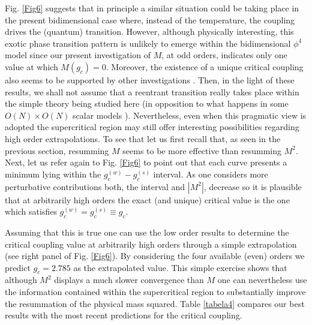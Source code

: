 \documentclass[a4paper,11pt]{article}
\begin{document}
Fig. \ref{Fig6} suggests that in principle a similar situation  could be taking place in the present bidimensional case where, instead of the temperature, the coupling drives the (quantum) transition.   However, although physically interesting, this exotic phase transition pattern is unlikely to emerge within the bidimensional $\phi^4$ model since our present investigation of $M$, at odd orders, indicates only one value at which $M(g_c)=0$. Moreover, the existence of a unique critical coupling  also seems to be supported by other investigations \cite {hamilton6, hamilton7, serone1, serone3}.  Then, in the light of these results, we shall  not assume that a  reentrant transition  really takes place within the simple theory being studied here (in opposition to what happens in some $O(N)\times O(N)$ scalar models \cite{julia}). 
Nevertheless, even when this pragmatic view is adopted the supercritical region may still offer  interesting possibilities regarding high order extrapolations.  To see that let us first recall that, as seen in the previous section, resumming $M$ seems to be more effective than resumming $M^2$.  Next, let us refer again to Fig. \ref {Fig6} to point out that each curve presents a minimum lying within the $g_c^{(w)}-g_c^{(s)}$ interval. As one considers more perturbative contributions  both, the interval and $|M^2|$, decrease so it is plausible that at arbitrarily high orders the exact (and unique) critical value is the one  which satisfies  $g_c^{(w)} = g_c^{(s)} \equiv g_c$. 

Assuming that this is true one can use the low order results to determine the critical coupling value at arbitrarily high orders  through a simple extrapolation (see right panel of Fig. \ref{Fig6}). By  considering the four available (even) orders we  predict $g_c = 2.785$ as the extrapolated value. This simple exercise shows that although $M^2$ displays a much slower convergence than $M$ one can nevertheless use the information contained within the supercritical region to substantially improve the resummation of the physical mass squared.  Table \ref{tabela4} compares our best results with the most recent predictions for the critical coupling.
\end{document}
